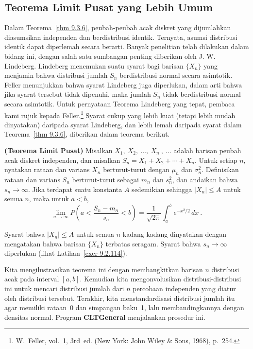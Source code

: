 \subsection*{Teorema Limit Pusat yang Lebih Umum}
Dalam Teorema~\ref{thm 9.3.6}, peubah-peubah acak diskret yang dijumlahkan diasumsikan independen
dan berdistribusi identik.  Ternyata, asumsi distribusi identik dapat diperlemah secara berarti.
Banyak penelitian telah dilakukan dalam bidang ini, dengan salah satu sumbangan penting diberikan
oleh J. W. Lindeberg.  Lindeberg menemukan suatu syarat bagi barisan
$\{X_n\}$ yang menjamin bahwa distribusi jumlah $S_n$ berdistribusi normal secara asimtotik.
Feller menunjukkan bahwa syarat Lindeberg juga diperlukan, dalam arti bahwa jika syarat tersebut
tidak dipenuhi, maka jumlah $S_n$ tidak berdistribusi normal secara asimtotik.  Untuk pernyataan
Teorema Lindeberg yang tepat, pembaca kami rujuk kepada Feller.\footnote{W.~Feller,
 vol.~1, 3rd~ed. (New York: John
Wiley \& Sons, 1968), p.~254.}  Syarat cukup yang lebih kuat (tetapi lebih mudah dinyatakan)
daripada syarat Lindeberg, dan lebih lemah daripada syarat dalam Teorema~\ref{thm 9.3.6}, diberikan
dalam teorema berikut.
\pagebreak[4]
\begin{theorem}{\bf (Teorema Limit Pusat)}\label{thm 9.3.7} 
Misalkan $X_1,\ X_2,\ \ldots,\ X_n\ ,\ \ldots$ adalah barisan peubah acak diskret independen,
dan misalkan $S_n = X_1 + X_2 +\cdots+ X_n$.  Untuk setiap $n$, nyatakan rataan dan varians $X_n$
berturut-turut dengan $\mu_n$ dan $\sigma^2_n$.  Definisikan rataan dan varians $S_n$
berturut-turut sebagai $m_n$ dan $s_n^2$, dan andaikan bahwa $s_n \rightarrow \infty$.  Jika
terdapat suatu konstanta $A$ sedemikian sehingga $|X_n| \le A$ untuk semua $n$, maka untuk $a < b$,
$$
\lim_{n \to \infty} P\left( a < \frac {S_n - m_n}{s_n} < b\right)
= \frac 1{\sqrt{2\pi}} \int_a^b e^{-x^2/2}\, dx\ .
$$
\end{theorem}
Syarat bahwa $|X_n| \le A$ untuk semua $n$ kadang-kadang dinyatakan dengan mengatakan bahwa
barisan $\{X_n\}$ terbatas seragam.  Syarat bahwa $s_n \rightarrow \infty$ diperlukan (lihat
Latihan~\ref{exer 9.2.114}).
\par
Kita mengilustrasikan teorema ini dengan membangkitkan barisan $n$ distribusi acak pada
interval $[a, b]$.  Kemudian kita mengonvolusikan distribusi-distribusi ini untuk mencari distribusi
jumlah dari $n$ percobaan independen yang diatur oleh distribusi tersebut.  Terakhir, kita
menstandardisasi distribusi jumlah itu agar memiliki rataan~0 dan simpangan baku~1, lalu
membandingkannya dengan densitas normal.  Program {\bf CLTGeneral}
menjalankan prosedur ini.

